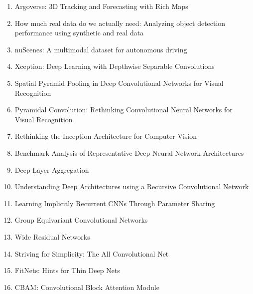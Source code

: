 \documentclass[acmlarge]{acmart}
\begin{document}
\begin{enumerate}
	\item Argoverse: 3D Tracking and Forecasting with Rich Maps \cite{chang2019argoverse} 

	\item How much real data do we actually need: Analyzing object detection performance using synthetic and real data \cite{nowruzi2019real} 

	\item nuScenes: A multimodal dataset for autonomous driving \cite{caesar2019nuscenes} 

	\item Xception: Deep Learning with Depthwise Separable Convolutions \cite{chollet2016xception} 

	\item Spatial Pyramid Pooling in Deep Convolutional Networks for Visual Recognition \cite{He_2014} 

	\item Pyramidal Convolution: Rethinking Convolutional Neural Networks for Visual Recognition \cite{duta2020pyramidal} 

	\item Rethinking the Inception Architecture for Computer Vision \cite{szegedy2015rethinking} 

	\item Benchmark Analysis of Representative Deep Neural Network Architectures \cite{Bianco_2018} 

	\item Deep Layer Aggregation \cite{yu2017deep} 

	\item Understanding Deep Architectures using a Recursive Convolutional Network \cite{eigen2013understanding} 

	\item Learning Implicitly Recurrent CNNs Through Parameter Sharing \cite{savarese2019learning} 

	\item Group Equivariant Convolutional Networks \cite{cohen2016group} 

	\item Wide Residual Networks \cite{zagoruyko2016wide} 

	\item Striving for Simplicity: The All Convolutional Net \cite{springenberg2014striving} 

	\item FitNets: Hints for Thin Deep Nets \cite{romero2014fitnets} 

	\item CBAM: Convolutional Block Attention Module \cite{woo2018cbam} 


\end{enumerate}
\end{document}
